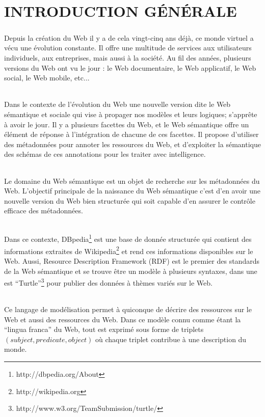\chapter{INTRODUCTION GÉNÉRALE}
\paragraph{}
Depuis la création du Web il y a de cela vingt-cinq ans déjà, ce monde virtuel a vécu une évolution constante. Il offre une multitude de services aux utilisateurs individuels, aux entreprises, mais aussi à la société. Au fil des années, plusieurs versions du Web ont vu le jour : le Web documentaire, le Web applicatif, le Web social, le Web mobile, etc...
\subparagraph{}
Dans le contexte de l’évolution du Web une nouvelle version dite le Web sémantique et sociale qui vise à propager nos modèles et leurs logiques; s’apprête à avoir le jour. Il y a plusieurs facettes du Web, et le Web sémantique offre un élément de réponse à l’intégration de chacune de ces facettes. Il propose d’utiliser des métadonnées pour annoter les ressources du Web, et d’exploiter la sémantique des schémas de ces annotations pour les traiter avec intelligence.
\subparagraph{}
Le domaine du Web sémantique est un objet de recherche sur les métadonnées du Web. L'objectif principale de la naissance du Web sémantique c'est d’en avoir une nouvelle version du Web bien structurée qui soit capable d’en assurer le contrôle efficace des métadonnées. 
\subparagraph{}
Dans ce contexte, DBpedia\footnote{http://dbpedia.org/About} est une base de donnée structurée qui contient des informations extraites de Wikipedia\footnote{http://wikipedia.org} et rend ces informations disponibles sur le Web. Aussi, Resource Description Framework (RDF) est le premier des standards de la Web sémantique et se trouve être un modèle à plusieurs syntaxes, dans une est  ``Turtle”\footnote{http://www.w3.org/TeamSubmission/turtle/} pour publier des données à thèmes variés sur le Web.
\subparagraph{}
Ce langage de modélisation permet à quiconque de décrire des ressources sur le Web et aussi des ressources du Web. Dans ce modèle connu comme étant la “lingua franca” du Web, tout est exprimé sous forme de triplets $(subject, predicate, object)$ où chaque triplet contribue à une description du monde.
